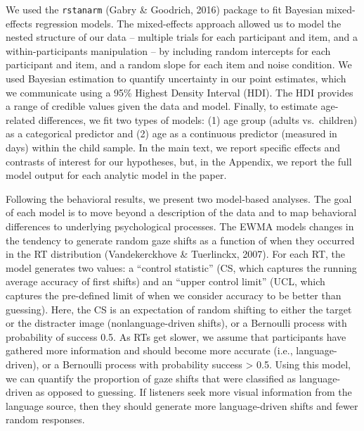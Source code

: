\documentclass[,man,floatsintext]{apa6}
\begin{document}
We used the \texttt{rstanarm} (Gabry \& Goodrich, 2016) package to fit
Bayesian mixed-effects regression models. The mixed-effects approach
allowed us to model the nested structure of our data -- multiple trials
for each participant and item, and a within-participants manipulation --
by including random intercepts for each participant and item, and a
random slope for each item and noise condition. We used Bayesian
estimation to quantify uncertainty in our point estimates, which we
communicate using a 95\% Highest Density Interval (HDI). The HDI
provides a range of credible values given the data and model. Finally,
to estimate age-related differences, we fit two types of models: (1) age
group (adults vs.~children) as a categorical predictor and (2) age as a
continuous predictor (measured in days) within the child sample. In the
main text, we report specific effects and contrasts of interest for our
hypotheses, but, in the Appendix, we report the full model output for
each analytic model in the paper.

Following the behavioral results, we present two model-based analyses.
The goal of each model is to move beyond a description of the data and
to map behavioral differences to underlying psychological processes. The
EWMA models changes in the tendency to generate random gaze shifts as a
function of when they occurred in the RT distribution (Vandekerckhove \&
Tuerlinckx, 2007). For each RT, the model generates two values: a
\enquote{control statistic} (CS, which captures the running average
accuracy of first shifts) and an \enquote{upper control limit} (UCL,
which captures the pre-defined limit of when we consider accuracy to be
better than guessing). Here, the CS is an expectation of random shifting
to either the target or the distracter image (nonlanguage-driven
shifts), or a Bernoulli process with probability of success 0.5. As RTs
get slower, we assume that participants have gathered more information
and should become more accurate (i.e., language-driven), or a Bernoulli
process with probability success \textgreater{} 0.5. Using this model,
we can quantify the proportion of gaze shifts that were classified as
language-driven as opposed to guessing. If listeners seek more visual
information from the language source, then they should generate more
language-driven shifts and fewer random responses.
\end{document}
